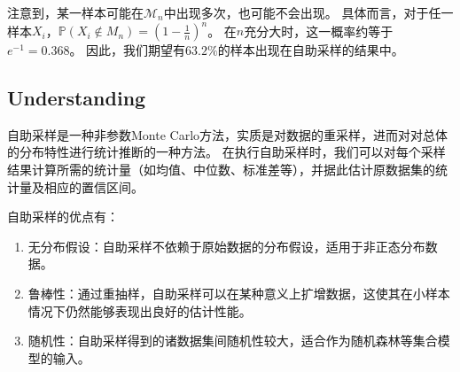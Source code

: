 \documentclass[12pt, a4paper]{article}
\newcommand{\prob}{{\mathbb{P}}}
\begin{document}
        注意到，某一样本可能在$\mathcal{M}_n$中出现多次，也可能不会出现。
        具体而言，对于任一样本$X_i$，$\prob (X_i \notin M_n) = (1 - \frac{1}{n})^n$。
        在$n$充分大时，这一概率约等于$e^{-1} = 0.368$。
        因此，我们期望有$63.2\%$的样本出现在自助采样的结果中。

    \subsection{Understanding}

        自助采样是一种非参数Monte Carlo方法，实质是对数据的重采样，进而对对总体的分布特性进行统计推断的一种方法。
        在执行自助采样时，我们可以对每个采样结果计算所需的统计量（如均值、中位数、标准差等），并据此估计原数据集的统计量及相应的置信区间。

        自助采样的优点有：
        \begin{enumerate}
        \item 无分布假设：自助采样不依赖于原始数据的分布假设，适用于非正态分布数据。
        \item 鲁棒性：通过重抽样，自助采样可以在某种意义上扩增数据，这使其在小样本情况下仍然能够表现出良好的估计性能。
        \item 随机性：自助采样得到的诸数据集间随机性较大，适合作为随机森林等集合模型的输入。
        \end{enumerate}
\end{document}
